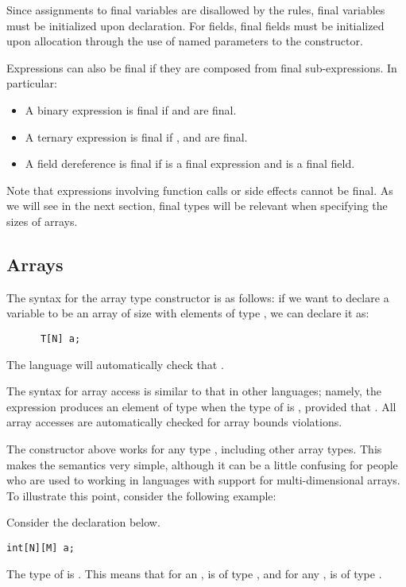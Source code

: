 Since assignments to final variables are disallowed by the rules, final variables must be initialized upon declaration. For fields, final fields must be initialized upon allocation through the use of named parameters to the constructor.

Expressions can also be final if they are composed from final sub-expressions. In particular:

\begin{itemize}
\item A binary expression  is final if  and  are final.
\item A ternary expression  is final if , and  are final.
\item A field dereference  is final if  is a final expression and  is a final field.
\end{itemize}

Note that expressions involving function calls or side effects cannot be final. As we will see in the next section, final types will be relevant when specifying the sizes of arrays.

\subsection{Arrays}
The syntax for the array type constructor is as follows: if we want to declare a variable  to be an array of size  with elements of type , we can declare it as:
\begin{lstlisting}
      T[N] a;
\end{lstlisting}
The language will automatically check that .

The syntax for array access is similar to that in other languages; namely, the expression  produces an element of type  when the type of  is , provided that . All array accesses are automatically checked for array bounds violations.

The constructor above works for any type , including other array types. This makes the semantics very simple, although it can be a little confusing for people who are used to working in languages with support for multi-dimensional arrays. To illustrate this point, consider the following example:
\begin{Example}
Consider the declaration below.
\begin{lstlisting}
int[N][M] a;
\end{lstlisting}
The type of  is . This means that for an ,  is of type , and for any ,  is of type .   
\end{Example}

